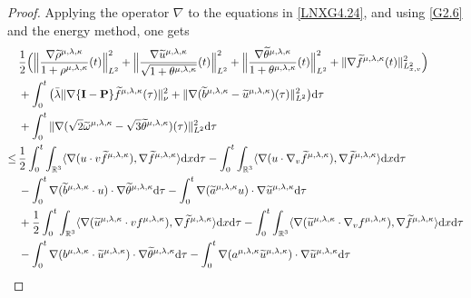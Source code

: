 \documentclass[reqno,11pt]{amsart}
\theoremstyle{plain}
\numberwithin{equation}{section}
\begin{document}
\begin{proof}
Applying the operator $\nabla$ to the equations in \eqref{LNXG4.24}, and using \eqref{G2.6} and the energy method, one gets 
\begin{align}\label{G4.17}
&\frac{1}{2}   \Big(\Big\|\frac{ \nabla\widetilde\rho^{\mu,\lambda,\kappa}}{1+\rho^{\mu,\lambda,\kappa}}(t)\Big\|_{L^2}^2+\Big\|\frac{\nabla \widetilde u^{\mu,\lambda,\kappa}}{\sqrt{1+\theta^{\mu,\lambda,\kappa}}}(t)\Big\|_{L^2}^{2}+\Big\|\frac{\nabla\widetilde\theta^{\mu,\lambda,\kappa}}{1+\theta^{\mu,\lambda,\kappa}}(t)\Big\|_{L^2}^2 +\|\nabla \widetilde{f}^{\mu,\lambda,\kappa}(t)\|_{L_{x,v}^{2}}^2\Big)  \nonumber\\
&+\int_0^t \big(  \bar\lambda\| \nabla\{\mathbf{I}-\mathbf{P}\}\widetilde{f}^{\mu,\lambda,\kappa}(\tau)\|_{\nu}^2 +\|\nabla(\widetilde{b}^{\mu,\lambda,\kappa}-\widetilde{u}^{\mu,\lambda,\kappa})(\tau)\|_{L^2}^2  \big){\rm d}\tau\nonumber\\
&+\int_0^t \|\nabla(\sqrt{2}\widetilde{\omega}^{\mu,\lambda,\kappa}-\sqrt{3}\widetilde{\theta}^{\mu,\lambda,\kappa})(\tau)\|_{L^2}^2  {\rm d}\tau\nonumber\\
\leq\,&\frac{1}{2}\int_0^t  \int_{\mathbb{R}^3 }\langle \nabla( u\cdot v\widetilde{f}^{\mu,\lambda,\kappa}),\nabla\widetilde{f}^{\mu,\lambda,\kappa}\rangle {\rm d}x{\rm d}\tau-\int_0^t  \int_{\mathbb{R}^3 }\langle \nabla( u\cdot \nabla_v\widetilde{f}^{\mu,\lambda,\kappa}),\nabla\widetilde{f}^{\mu,\lambda,\kappa}\rangle {\rm d}x{\rm d}\tau\nonumber\\
&-\int_0^t \nabla(\widetilde{b}^{\mu,\lambda,\kappa}\cdot {u} )\cdot\nabla\widetilde{\theta}^{\mu,\lambda,\kappa}{\rm d}\tau       -\int_0^t \nabla(\widetilde{a}^{\mu,\lambda,\kappa} u)\cdot\nabla\widetilde{u}^{\mu,\lambda,\kappa}{\rm d}{\tau}  \nonumber\\
&+\frac{1}{2} \int_0^t  \int_{\mathbb{R}^3 }\langle\nabla(\widetilde{u}^{\mu,\lambda,\kappa}\cdot v{f}^{\mu,\lambda,\kappa}),\nabla\widetilde{f}^{\mu,\lambda,\kappa}\rangle {\rm d}x{\rm d}\tau -\int_0^t  \int_{\mathbb{R}^3 }\langle\nabla(\widetilde{u}^{\mu,\lambda,\kappa}\cdot \nabla_v{f}^{\mu,\lambda,\kappa}),\nabla\widetilde{f}^{\mu,\lambda,\kappa}\rangle {\rm d}x{\rm d}\tau    \nonumber\\
&-\int_0^t \nabla({b}^{\mu,\lambda,\kappa}\cdot  \widetilde{u}^{\mu,\lambda,\kappa} )\cdot\nabla\widetilde{\theta}^{\mu,\lambda,\kappa}{\rm d}\tau-\int_0^t\nabla({a}^{\mu,\lambda,\kappa}  \widetilde{u}^{\mu,\lambda,\kappa})\cdot\nabla\widetilde{u}^{\mu,\lambda,\kappa} {\rm d}{\tau}            \nonumber\\

\end{align}
\end{proof}
\end{document}
